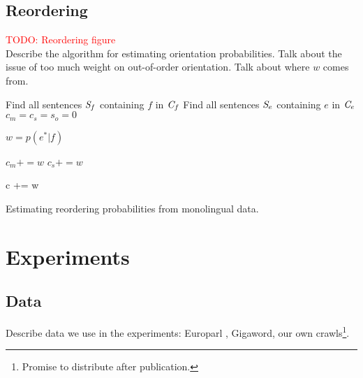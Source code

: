 \documentclass[11pt]{article}
\newcommand{\todo}[1]{\textcolor{red}{TODO: #1}}
\begin{document}
\subsection{Reordering} \label{sect:order}

\todo{Reordering figure}\\
Describe the algorithm for estimating orientation probabilities.  Talk about the issue of too much weight on out-of-order orientation.  Talk about where $w$ comes from.

\begin{algorithm}[t]
\vskip 0.1in
  \BlankLine
  
  Find all sentences $\emph{S}_f$ containing $f$ in $\emph{C}_f$\;
  Find all sentences $\emph{S}_e$ containing $e$ in $\emph{C}_e$\;
  $c_m = c_s = s_o = 0$\;
  
   {
    
     {

       {
    
         {

          $w = p(e^{*} | f)$\;
        
           {
            $c_m += w$\; 
          }  {
            $c_s += w$\;
          } 
       
          c += w\;
      }
    }
  }
}

\caption{Estimating reordering probabilities from monolingual data.}
\label{fig:reorder}
\end{algorithm}

\section{Experiments} \label{sect:exp}

\subsection{Data}
Describe data we use in the experiments:  Europarl \cite{Koehn:2005}, Gigaword, our own crawls\footnote{Promise to distribute after publication.}.
\end{document}

